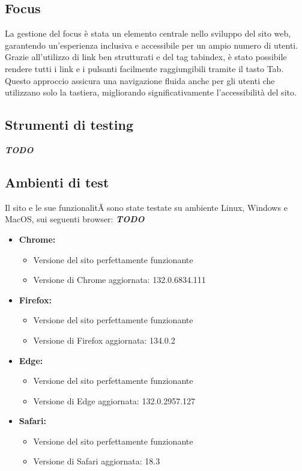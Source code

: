 \subsection{Focus}
La gestione del focus è stata un elemento centrale nello sviluppo del sito web, garantendo un’esperienza inclusiva e accessibile per un ampio numero di utenti. Grazie all’utilizzo di link ben strutturati e del tag tabindex, è stato possibile rendere tutti i link e i pulsanti facilmente raggiungibili tramite il tasto Tab. Questo approccio assicura una navigazione fluida anche per gli utenti che utilizzano solo la tastiera, migliorando significativamente l’accessibilità del sito.
\subsection{Strumenti di testing}
\textbf{\textit{TODO}}
\subsection{Ambienti di test}
Il sito e le sue funzionalitÃ sono state testate su ambiente Linux, Windows e MacOS, sui seguenti browser: \textbf{\textit{TODO}}
\begin{itemize}
    \item \textbf{Chrome:}
        \begin{itemize}
            \item Versione del sito perfettamente funzionante
            \item Versione di Chrome aggiornata: 132.0.6834.111
        \end{itemize}
    \item \textbf{Firefox:}
        \begin{itemize}
            \item Versione del sito perfettamente funzionante
            \item Versione di Firefox aggiornata: 134.0.2
        \end{itemize}
    \item \textbf{Edge:} 
        \begin{itemize}
            \item Versione del sito perfettamente funzionante
            \item Versione di Edge aggiornata: 132.0.2957.127
        \end{itemize}
    \item \textbf{Safari:} 
        \begin{itemize}
            \item Versione del sito perfettamente funzionante
            \item Versione di Safari aggiornata: 18.3
        \end{itemize}
\end{itemize}
